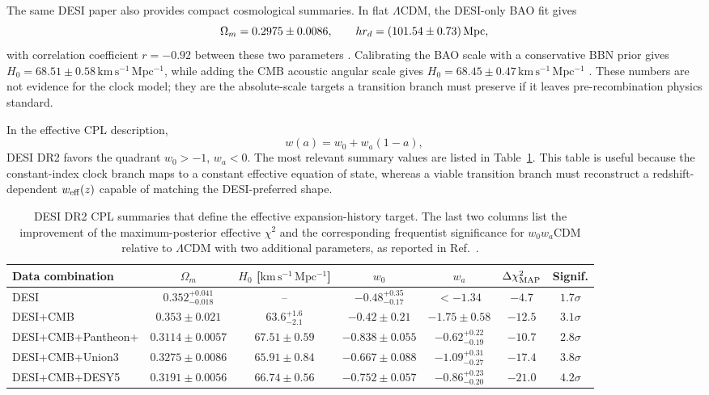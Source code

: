 \documentclass[aps,prd,reprint,nofootinbib,superscriptaddress,longbibliography]{revtex4-2}
\newcommand{\LCDM}{$\Lambda$CDM}
\newcommand{\kmsMpc}{\,\mathrm{km\,s^{-1}\,Mpc^{-1}}}
\begin{document}
The same DESI paper also provides compact cosmological summaries.  In flat \LCDM{}, the DESI-only BAO fit gives
\begin{equation}
\Omega_m=0.2975\pm0.0086,\qquad h r_d=(101.54\pm0.73)\,{\rm Mpc},
\label{eq:desi_lcdm_summary}
\end{equation}
with correlation coefficient $r=-0.92$ between these two parameters \cite{DESIDR2}.  Calibrating the BAO scale with a conservative BBN prior gives $H_0=68.51\pm0.58\kmsMpc$, while adding the CMB acoustic angular scale gives $H_0=68.45\pm0.47\kmsMpc$ \cite{DESIDR2}.  These numbers are not evidence for the clock model; they are the absolute-scale targets a transition branch must preserve if it leaves pre-recombination physics standard.

In the effective CPL description,
\begin{equation}
w(a)=w_0+w_a(1-a),
\label{eq:CPL}
\end{equation}
DESI DR2 favors the quadrant $w_0>-1$, $w_a<0$.  The most relevant summary values are listed in Table~\ref{tab:desi_w0wa}.  This table is useful because the constant-index clock branch maps to a constant effective equation of state, whereas a viable transition branch must reconstruct a redshift-dependent $w_{\rm eff}(z)$ capable of matching the DESI-preferred shape.

\begin{table}[t]
\footnotesize
\caption{DESI DR2 CPL summaries that define the effective expansion-history target.  The last two columns list the improvement of the maximum-posterior effective $\chi^2$ and the corresponding frequentist significance for $w_0w_a$CDM relative to \LCDM{} with two additional parameters, as reported in Ref.~\cite{DESIDR2}.}
\begin{ruledtabular}
\begin{tabular}{lcccccc}
Data combination & $\Omega_m$ & $H_0$ [$\mathrm{km\,s^{-1}\,Mpc^{-1}}$] & $w_0$ & $w_a$ & $\Delta\chi^2_{\rm MAP}$ & Signif. \\
\hline
DESI & $0.352^{+0.041}_{-0.018}$ & -- & $-0.48^{+0.35}_{-0.17}$ & $< -1.34$ & $-4.7$ & $1.7\sigma$ \\
DESI+CMB & $0.353\pm0.021$ & $63.6^{+1.6}_{-2.1}$ & $-0.42\pm0.21$ & $-1.75\pm0.58$ & $-12.5$ & $3.1\sigma$ \\
DESI+CMB+Pantheon+ & $0.3114\pm0.0057$ & $67.51\pm0.59$ & $-0.838\pm0.055$ & $-0.62^{+0.22}_{-0.19}$ & $-10.7$ & $2.8\sigma$ \\
DESI+CMB+Union3 & $0.3275\pm0.0086$ & $65.91\pm0.84$ & $-0.667\pm0.088$ & $-1.09^{+0.31}_{-0.27}$ & $-17.4$ & $3.8\sigma$ \\
DESI+CMB+DESY5 & $0.3191\pm0.0056$ & $66.74\pm0.56$ & $-0.752\pm0.057$ & $-0.86^{+0.23}_{-0.20}$ & $-21.0$ & $4.2\sigma$ \\
\end{tabular}
\end{ruledtabular}
\label{tab:desi_w0wa}
\end{table}
\end{document}
